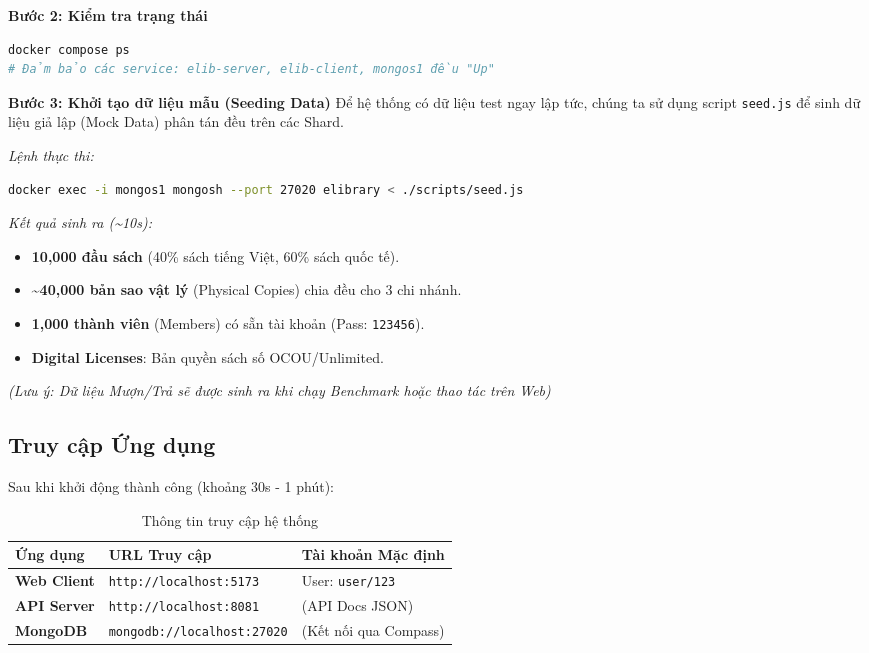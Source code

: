 \documentclass[a4paper,12pt]{article}
\begin{document}
\textbf{Bước 2: Kiểm tra trạng thái}
\begin{lstlisting}[language=bash]
docker compose ps
# Đảm bảo các service: elib-server, elib-client, mongos1 đều "Up"
\end{lstlisting}

\textbf{Bước 3: Khởi tạo dữ liệu mẫu (Seeding Data)}
Để hệ thống có dữ liệu test ngay lập tức, chúng ta sử dụng script \texttt{seed.js} để sinh dữ liệu giả lập (Mock Data) phân tán đều trên các Shard.

\textit{Lệnh thực thi:}
\begin{lstlisting}[language=bash]
docker exec -i mongos1 mongosh --port 27020 elibrary < ./scripts/seed.js
\end{lstlisting}

\textit{Kết quả sinh ra (\textasciitilde 10s):}
\begin{itemize}
    \item \textbf{10,000 đầu sách} (40\% sách tiếng Việt, 60\% sách quốc tế).
    \item \textbf{\textasciitilde 40,000 bản sao vật lý} (Physical Copies) chia đều cho 3 chi nhánh.
    \item \textbf{1,000 thành viên} (Members) có sẵn tài khoản (Pass: \texttt{123456}).
    \item \textbf{Digital Licenses}: Bản quyền sách số OCOU/Unlimited.
\end{itemize}
\textit{(Lưu ý: Dữ liệu Mượn/Trả sẽ được sinh ra khi chạy Benchmark hoặc thao tác trên Web)}

\subsection{Truy cập Ứng dụng}
Sau khi khởi động thành công (khoảng 30s - 1 phút):

\begin{table}[H]
\centering
\begin{tabularx}{\textwidth}{|l|l|X|}
\hline
\textbf{Ứng dụng} & \textbf{URL Truy cập} & \textbf{Tài khoản Mặc định} \\
\hline
\textbf{Web Client} & \texttt{http://localhost:5173} & User: \texttt{user/123} \\
\hline
\textbf{API Server} & \texttt{http://localhost:8081} & (API Docs JSON) \\
\hline
\textbf{MongoDB} & \texttt{mongodb://localhost:27020} & (Kết nối qua Compass) \\
\hline
\end{tabularx}
\caption{Thông tin truy cập hệ thống}
\end{table}
\end{document}
